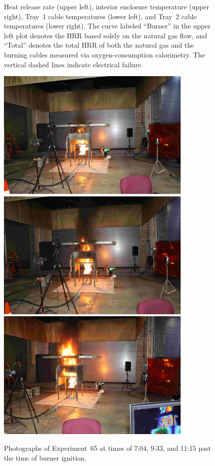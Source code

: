 \begin{figure}[H]
\caption[HRR and temperatures of Experiment 65]{Heat release rate (upper left), interior enclosure temperature (upper right), Tray~1 cable temperatures (lower left), and Tray~2 cable temperatures (lower right). The curve labeled ``Burner'' in the upper left plot denotes the HRR based solely on the natural gas flow, and ``Total'' denotes the total HRR of both the natural gas and the burning cables measured via oxygen-consumption calorimetry. The vertical dashed lines indicate electrical failure.}
\label{fig:Test_65}
\end{figure}

\begin{figure}[p]
\centering
\includegraphics[height=2.50in]{../FIGURES/Test_65_Photo_1} \\ \vspace{0.1in}
\includegraphics[height=2.50in]{../FIGURES/Test_65_Photo_2} \\ \vspace{0.1in}
\includegraphics[height=2.50in]{../FIGURES/Test_65_Photo_3}
\caption[Photographs of Experiment~65]{Photographs of Experiment~65 at times of 7:04, 9:33, and 11:15 past the time of burner ignition.}
\label{fig:Test_65_photos}
\end{figure}



